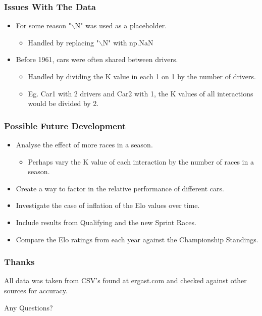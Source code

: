 \documentclass{beamer}
\begin{document}
\begin{frame}
    \frametitle{Issues With The Data}
    \begin{itemize}
        \item For some reason "$\backslash$N" was used as a placeholder.
        \begin{itemize}
            \item Handled by replacing "$\backslash$N" with np.NaN
        \end{itemize}
        \item Before 1961, cars were often shared between drivers.
        \begin{itemize}
            \item Handled by dividing the K value in each 1 on 1 by the number of drivers.
            \item Eg. Car1 with 2 drivers and Car2 with 1, the K values of all interactions would be divided by 2.
        \end{itemize}
    \end{itemize}
\end{frame}

\begin{frame}
    \frametitle{Possible Future Development}
    \begin{itemize}
        \item Analyse the effect of more races in a season.
        \begin{itemize}
            \item Perhaps vary the K value of each interaction by the number of races in a season.
        \end{itemize}
        \item Create a way to factor in the relative performance of different cars.
        \item Investigate the case of inflation of the Elo values over time.
        \item Include results from Qualifying and the new Sprint Races.
        \item Compare the Elo ratings from each year against the Championship Standings.
    \end{itemize}
\end{frame}


\begin{frame}
    \frametitle{Thanks}
    \begin{center}
        All data was taken from CSV's found at ergast.com and checked against other sources for accuracy.
    
        \LARGE{Any Questions?}
    \end{center}
\end{frame}
\end{document}
